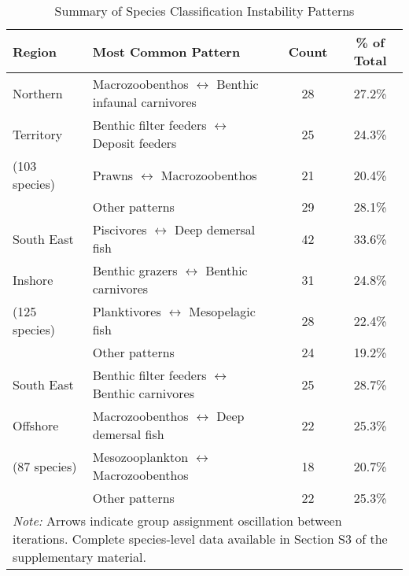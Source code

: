 \begin{table}[htbp]
\centering
\caption{Summary of Species Classification Instability Patterns}
\label{tab:unstable_species}
\small
\begin{tabular}{llcc}
\hline
Region & Most Common Pattern & Count & \% of Total \\
\hline
Northern & Macrozoobenthos $\leftrightarrow$ Benthic infaunal carnivores & 28 & 27.2\% \\
Territory & Benthic filter feeders $\leftrightarrow$ Deposit feeders & 25 & 24.3\% \\
(103 species) & Prawns $\leftrightarrow$ Macrozoobenthos & 21 & 20.4\% \\
& Other patterns & 29 & 28.1\% \\
\hline
South East & Piscivores $\leftrightarrow$ Deep demersal fish & 42 & 33.6\% \\
Inshore & Benthic grazers $\leftrightarrow$ Benthic carnivores & 31 & 24.8\% \\
(125 species) & Planktivores $\leftrightarrow$ Mesopelagic fish & 28 & 22.4\% \\
& Other patterns & 24 & 19.2\% \\
\hline
South East & Benthic filter feeders $\leftrightarrow$ Benthic carnivores & 25 & 28.7\% \\
Offshore & Macrozoobenthos $\leftrightarrow$ Deep demersal fish & 22 & 25.3\% \\
(87 species) & Mesozooplankton $\leftrightarrow$ Macrozoobenthos & 18 & 20.7\% \\
& Other patterns & 22 & 25.3\% \\
\hline
\multicolumn{4}{p{0.95\textwidth}}{\small \textit{Note:} Arrows indicate group assignment oscillation between iterations. Complete species-level data available in Section S3 of the supplementary material.} \\
\hline
\end{tabular}
\end{table}
